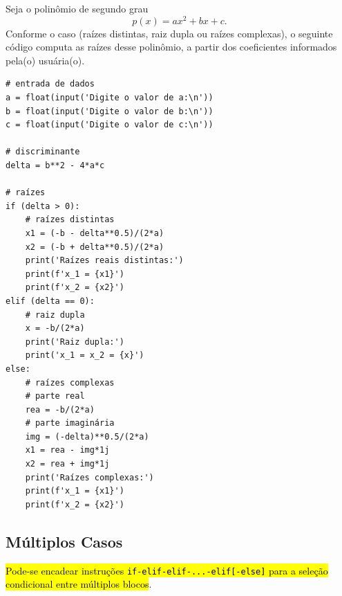 \begin{ex}
  Seja o polinômio de segundo grau
  \begin{equation}
    p(x) = ax^2 + bx + c.
  \end{equation}
  Conforme o caso (raízes distintas, raiz dupla ou raízes complexas), o seguinte código computa as raízes  desse polinômio, a partir dos coeficientes informados pela(o) usuária(o).
\begin{lstlisting}
# entrada de dados
a = float(input('Digite o valor de a:\n'))
b = float(input('Digite o valor de b:\n'))
c = float(input('Digite o valor de c:\n'))

# discriminante
delta = b**2 - 4*a*c

# raízes
if (delta > 0):
    # raízes distintas
    x1 = (-b - delta**0.5)/(2*a)
    x2 = (-b + delta**0.5)/(2*a)
    print('Raízes reais distintas:')
    print(f'x_1 = {x1}')
    print(f'x_2 = {x2}')
elif (delta == 0):
    # raiz dupla
    x = -b/(2*a)
    print('Raiz dupla:')
    print('x_1 = x_2 = {x}')
else:
    # raízes complexas
    # parte real
    rea = -b/(2*a)
    # parte imaginária
    img = (-delta)**0.5/(2*a)
    x1 = rea - img*1j
    x2 = rea + img*1j
    print('Raízes complexas:')
    print(f'x_1 = {x1}')
    print(f'x_2 = {x2}')
\end{lstlisting}
\end{ex}

\subsection{Múltiplos Casos}

\hl{Pode-se encadear instruções {\lstinline+if-elif-elif-...-elif[-else]+} para a seleção condicional entre múltiplos blocos}.

